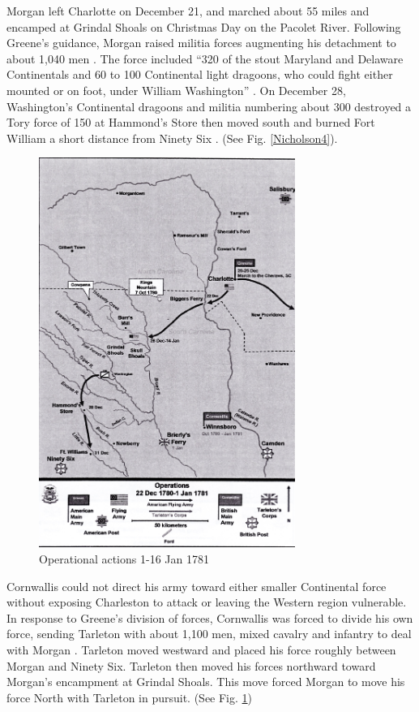 Morgan left Charlotte on December 21, and marched about 55 miles and encamped at
Grindal Shoals on Christmas Day on the Pacolet River.  Following Greene’s
guidance, Morgan raised militia forces augmenting his detachment to about 1,040
men \cite[p.28]{weigley_partisan_1970}.   The force included “320 of the stout Maryland and
Delaware Continentals and 60 to 100 Continental light dragoons, who could fight
either mounted or on foot, under William Washington” \cite[p.28]{weigley_partisan_1970}.   On
December 28, Washington’s Continental dragoons and militia numbering about 300
destroyed a Tory force of 150 at Hammond’s Store then moved south and burned
Fort William a short distance from Ninety Six \cite[p.8]{babits_devil_2001}.
(See Fig. \ref{Nicholson4}).


\begin{figure}[h]
\begin{center}
\includegraphics[height=5in]{gfx/Nicholson5}
\end{center}
\caption{Operational actions 1-16 Jan 1781 \cite[Tab D, Map 7]{rauch_battle_2007}}
\label{Nicholson5}
\end{figure}

Cornwallis could not direct his army toward either smaller Continental force
without exposing Charleston to attack or leaving the Western region vulnerable.
In response to Greene’s division of forces, Cornwallis was forced to divide his
own force, sending Tarleton with about 1,100 men, mixed cavalry and infantry to
deal with Morgan \cite[28]{weigley_partisan_1970}.   Tarleton moved westward and placed his force
roughly between Morgan and Ninety Six.  Tarleton then moved his forces northward
toward Morgan’s encampment at Grindal Shoals.   This move forced Morgan to move
his force North with Tarleton in pursuit. (See Fig. \ref{Nicholson5})


